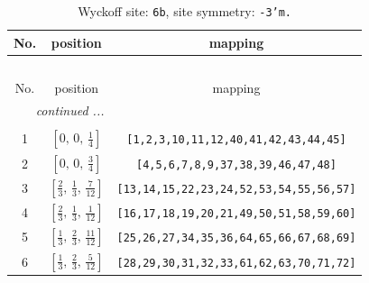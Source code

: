 \documentclass[fleqn,8pt]{jsarticle}
\begin{document}
\begin{longtable}{ccc}
\caption{Wyckoff site: {\tt 6b}, site symmetry: {\tt -3'm.}}
 \\
 \hline \hline
No. & position & mapping \\ \hline \endfirsthead

\multicolumn{2}{l}{\tablename\ \thetable{}} \\
 \hline \hline
No. & position & mapping \\ \hline \endhead

 \hline \hline
\multicolumn{2}{r}{\footnotesize\it continued ...} \\ \endfoot

 \hline \hline
\multicolumn{2}{r}{} \\ \endlastfoot

1 & $\left[ 0,\, 0,\, \frac{1}{4} \right]$ & {\tt [1,2,3,10,11,12,40,41,42,43,44,45]} \\ \hline
2 & $\left[ 0,\, 0,\, \frac{3}{4} \right]$ & {\tt [4,5,6,7,8,9,37,38,39,46,47,48]} \\ \hline
3 & $\left[ \frac{2}{3},\, \frac{1}{3},\, \frac{7}{12} \right]$ & {\tt [13,14,15,22,23,24,52,53,54,55,56,57]} \\ \hline
4 & $\left[ \frac{2}{3},\, \frac{1}{3},\, \frac{1}{12} \right]$ & {\tt [16,17,18,19,20,21,49,50,51,58,59,60]} \\ \hline
5 & $\left[ \frac{1}{3},\, \frac{2}{3},\, \frac{11}{12} \right]$ & {\tt [25,26,27,34,35,36,64,65,66,67,68,69]} \\ \hline
6 & $\left[ \frac{1}{3},\, \frac{2}{3},\, \frac{5}{12} \right]$ & {\tt [28,29,30,31,32,33,61,62,63,70,71,72]} \\
\end{longtable}
\renewcommand{\arraystretch}{1.2}
\end{document}
